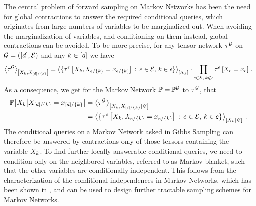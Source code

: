 The central problem of forward sampling on Markov Networks has been the need for global contractions to answer the required conditional queries, which originates from large numbers of variables to be marginalized out.
When avoiding the marginalization of variables, and conditioning on them instead, global contractions can be avoided.
To be more precise, for any tensor network $\tau^{\mathcal{G}}$ on $\mathcal{G}=([d],\mathcal{E})$ and any $k\in[d]$ we have
\begin{align*}
    \left\langle \tau^{\mathcal{G}}\right\rangle_{\left[ X_{k},X_{[d]/\{k\}} \right]}
    = \left\langle \{\tau^{e}\left[X_{k},X_{e/\{k\}}=x_{e/\{k\}}\right] \,:\, e\in\mathcal{E} ,\, k\in e\}\right\rangle_{\left[ X_{k} \right]}
    \cdot \prod_{e\in\mathcal{E}, \, k\notin e} \tau^{e}\left[X_{e}=x_{e}\right] \, .
\end{align*}
As a consequence, we get for the Markov Network $\mathbb{P}=\mathbb{P}^{\mathcal{G}}$ to $\tau^{\mathcal{G}}$, that
\begin{align*}
    \mathbb{P}\big[X_{k}\big|X_{[d]/\{k\}}=x_{[d]/\{k\}}\big]
    &= \left\langle \tau^{\mathcal{G}}\right\rangle_{\left[ X_{k},X_{[d]/\{k\}} | \varnothing \right]} \\
    &= \left\langle \{\tau^{e}\left[X_{k},X_{e/\{k\}}=x_{e/\{k\}}\right] \,:\, e\in\mathcal{E}, \, k\in e\}\right\rangle_{\left[ X_{k} | \varnothing \right]} \, .
\end{align*}
The conditional queries on a Markov Network asked in Gibbs Sampling can therefore be answered by contractions only of those tensors containing the variable $X_{k}$.
To find further locally answerable conditional queries, we need to condition only on the neighbored variables, referred to as Markov blanket, such that the other variables are conditionally independent.
This follows from the characterization of the conditional independences in Markov Networks, which has been shown in , and can be used to design further tractable sampling schemes for Markov Networks.


